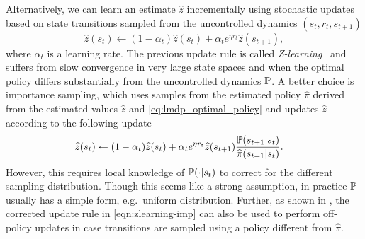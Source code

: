 Alternatively, we can learn an estimate $\widehat{z}$ incrementally using stochastic updates based on state transitions sampled from the uncontrolled dynamics $(s_t,r_t,s_{t+1})$
\[
\widehat{z}(s_t) \leftarrow (1-\alpha_t)\widehat{z}(s_t) + \alpha_t e^{\eta r_t}\widehat{z}(s_{t+1}),
\]
where $\alpha_t$ is a learning rate. 
The previous update rule is called \emph{Z-learning}~\citep{Todorov2006} and suffers from slow convergence in very large state spaces and when the optimal policy differs substantially from the uncontrolled dynamics $\mathbb{P}$.
A better choice is importance sampling, which uses samples from the estimated policy $\widehat{\pi}$ derived from the estimated values $\widehat{z}$ and \eqref{eq:lmdp_optimal_policy} and updates $\widehat{z}$ according to the following update
\begin{align}\label{eqn:zlearning-imp}
\widehat{z}(s_t) \leftarrow (1-\alpha_t)& \widehat{z}(s_t) + \alpha_t e^{\eta r_t}\widehat{z}(s_{t+1})\frac {\mathbb{P}(s_{t+1}|s_t)} {\widehat{\pi}(s_{t+1}|s_t)}.
\end{align}
However, this requires local knowledge of $\mathbb{P}(\cdot|s_t)$ to correct for the different sampling distribution.
Though this seems like a strong assumption, in practice $\mathbb{P}$ usually has a simple form, e.g.~uniform distribution.
Further, as shown in \citep{Jonsson2016}, the corrected update rule in \eqref{eqn:zlearning-imp} can also be used to perform off-policy updates in case transitions are sampled using a policy different from $\widehat{\pi}$.

